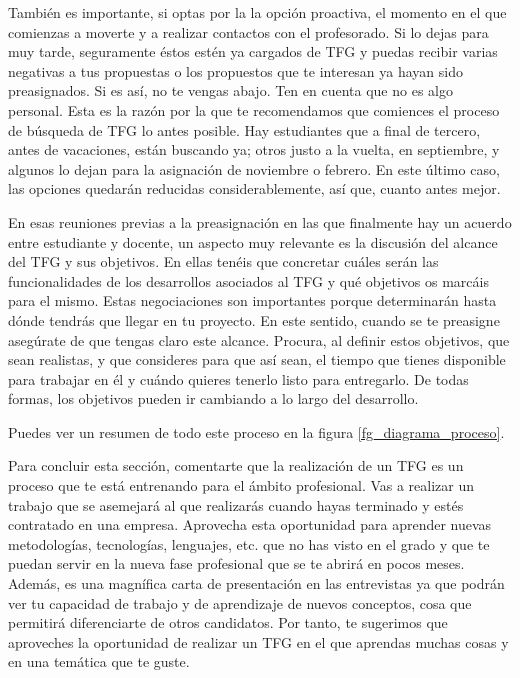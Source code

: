 También es importante, si optas por la la opción proactiva, el momento en el que comienzas a moverte y a realizar contactos con el profesorado. Si lo dejas para muy tarde, seguramente éstos estén ya cargados de TFG y puedas recibir varias negativas a tus propuestas o los propuestos que te interesan ya hayan sido preasignados. Si es así, no te vengas abajo. Ten en cuenta que no es algo personal. Esta es la razón por la que te recomendamos que comiences el proceso de búsqueda de TFG lo antes posible. Hay estudiantes que a final de tercero, antes de vacaciones, están buscando ya; otros justo a la vuelta, en septiembre, y algunos lo dejan para la asignación de noviembre o febrero. En este último caso, las opciones quedarán reducidas considerablemente, así que, cuanto antes mejor.

En esas reuniones previas a la preasignación en las que finalmente hay un acuerdo entre estudiante y docente, un aspecto muy relevante es la discusión del alcance del TFG y sus objetivos. En ellas tenéis que concretar cuáles serán las funcionalidades de los desarrollos asociados al TFG y qué objetivos os marcáis para el mismo. Estas negociaciones son importantes porque determinarán hasta dónde tendrás que llegar en tu proyecto. En este sentido, cuando se te preasigne asegúrate de que tengas claro este alcance. Procura, al definir estos objetivos, que sean realistas, y que consideres para que así sean, el tiempo que tienes disponible para trabajar en él y cuándo quieres tenerlo listo para entregarlo. De todas formas, los objetivos pueden ir cambiando a lo largo del desarrollo.

Puedes ver un resumen de todo este proceso en la figura  \ref{fg_diagrama_proceso}.

Para concluir esta sección, comentarte que la realización de un TFG es un proceso que te está entrenando para el ámbito profesional. Vas a realizar un trabajo que se asemejará al que realizarás cuando hayas terminado y estés contratado en una empresa. Aprovecha esta oportunidad para aprender nuevas metodologías, tecnologías, lenguajes, etc. que no has visto en el grado y que te puedan servir en la nueva fase profesional que se te abrirá en pocos meses. Además, es una magnífica carta de presentación en las entrevistas ya que podrán ver tu capacidad de trabajo y de aprendizaje de nuevos conceptos, cosa que permitirá diferenciarte de otros candidatos. Por tanto, te sugerimos que aproveches la oportunidad de realizar un TFG en el que aprendas muchas cosas y en una temática que te guste. 

